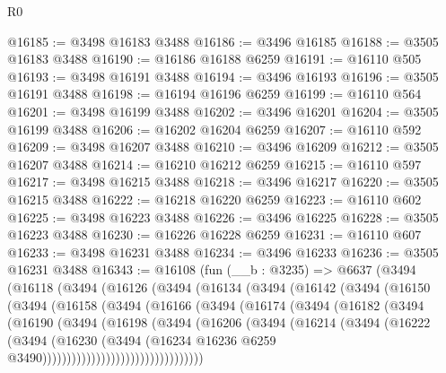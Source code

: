 \begin{lexlean}{R0}
\begin{coremodule}
@16185 := @3498 @16183 @3488
@16186 := @3496 @16185
@16188 := @3505 @16183 @3488
@16190 := @16186 @16188 @6259
@16191 := @16110 @505
@16193 := @3498 @16191 @3488
@16194 := @3496 @16193
@16196 := @3505 @16191 @3488
@16198 := @16194 @16196 @6259
@16199 := @16110 @564
@16201 := @3498 @16199 @3488
@16202 := @3496 @16201
@16204 := @3505 @16199 @3488
@16206 := @16202 @16204 @6259
@16207 := @16110 @592
@16209 := @3498 @16207 @3488
@16210 := @3496 @16209
@16212 := @3505 @16207 @3488
@16214 := @16210 @16212 @6259
@16215 := @16110 @597
@16217 := @3498 @16215 @3488
@16218 := @3496 @16217
@16220 := @3505 @16215 @3488
@16222 := @16218 @16220 @6259
@16223 := @16110 @602
@16225 := @3498 @16223 @3488
@16226 := @3496 @16225
@16228 := @3505 @16223 @3488
@16230 := @16226 @16228 @6259
@16231 := @16110 @607
@16233 := @3498 @16231 @3488
@16234 := @3496 @16233
@16236 := @3505 @16231 @3488
@16343 := @16108
    (fun (__b : @3235) =>
    @6637
      (@3494
        (@16118
          (@3494
            (@16126
              (@3494
                (@16134
                  (@3494
                    (@16142
                      (@3494
                        (@16150
                          (@3494
                            (@16158
                              (@3494
                                (@16166
                                  (@3494
                                    (@16174
                                      (@3494
                                        (@16182
                                          (@3494
                                            (@16190
                                              (@3494
                                                (@16198
                                                  (@3494
                                                    (@16206
                                                      (@3494
                                                        (@16214
                                                          (@3494
                                                            (@16222
                                                              (@3494
                                                                (@16230
                                                                  (@3494
                                                                    (@16234
                                                                      @16236
                                                                      @6259
                                                                      @3490)))))))))))))))))))))))))))))))))

\end{coremodule}
\end{lexlean}
